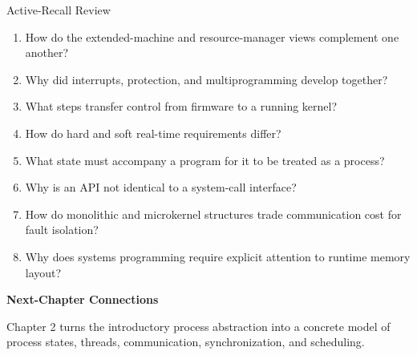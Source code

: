 \documentclass[10pt,letterpaper]{article}
\begin{document}
\enlargethispage{2\baselineskip}
\begin{studybox}{Active-Recall Review}
\small
\begin{enumerate}
  \item How do the extended-machine and resource-manager views complement one another?
  \item Why did interrupts, protection, and multiprogramming develop together?
  \item What steps transfer control from firmware to a running kernel?
  \item How do hard and soft real-time requirements differ?
  \item What state must accompany a program for it to be treated as a process?
  \item Why is an API not identical to a system-call interface?
  \item How do monolithic and microkernel structures trade communication cost for fault isolation?
  \item Why does systems programming require explicit attention to runtime memory layout?
\end{enumerate}
\end{studybox}

\par\medskip
{\color{navy}\bfseries Next-Chapter Connections}\par\smallskip
Chapter 2 turns the introductory process abstraction into a concrete model of process states, threads, communication, synchronization, and scheduling.
\normalsize
\end{document}
